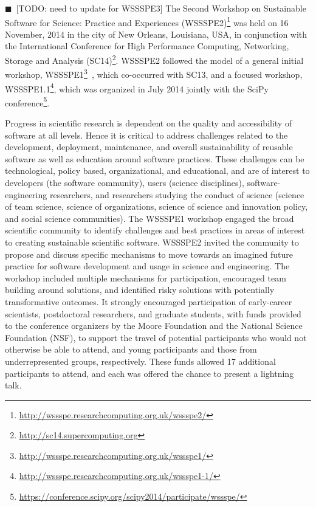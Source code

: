 \documentclass[11pt, oneside]{amsart}
\newcommand{\todo}[1]{{\color{blue}$\blacksquare$~\textsf{[TODO: #1]}}}
\newcommand{\note}[1]{ {\textcolor{blueish}    { ***Note:      #1 }}}
\newcommand{\katznote}[1]{ {\textcolor{magenta}    { ***Dan:      #1 }}}
\newcommand{\gabnote}[1]{ {\textcolor{cyan}    { ***Gabrielle:     #1 }}}
\newcommand{\nchnote}[1]{  {\textcolor{orange}      { ***Neil: #1 }}}
\newcommand{\manishnote}[1]{  {\textcolor{violet}     { ***Manish: #1 }}}
\newcommand{\davidnote}[1]{  {\textcolor{darkgreen}      { ***David: #1 }}}
\begin{document}
%
%
%
%


\todo{need to update for WSSSPE3}
The Second Workshop on Sustainable Software for Science: Practice and
Experiences
(WSSSPE2)\footnote{\url{http://wssspe.researchcomputing.org.uk/wssspe2/}} was
held on 16 November, 2014 in the city of New Orleans, Louisiana, USA, in
conjunction with the International Conference for High Performance Computing,
Networking, Storage and Analysis
(SC14)\footnote{\url{http://sc14.supercomputing.org}}. WSSSPE2 followed the
model of a general initial workshop,
WSSSPE1\footnote{\url{http://wssspe.researchcomputing.org.uk/wssspe1/}}~\cite{WSSSPE1-pre-report,WSSSPE1},
which co-occurred with SC13, and a focused workshop,
WSSSPE1.1\footnote{\url{http://wssspe.researchcomputing.org.uk/wssspe1-1/}},
which was organized in July 2014 jointly with the SciPy
conference\footnote{\url{https://conference.scipy.org/scipy2014/participate/wssspe/}}.

Progress in scientific research is dependent on the quality and accessibility of
software at all levels. Hence it is critical to address challenges related to
the development, deployment, maintenance, and overall sustainability of reusable
software as well as education around software practices. These challenges can be
technological, policy based, organizational, and educational, and are of
interest to developers (the software community), users (science disciplines),
software-engineering researchers, and researchers studying the conduct of
science (science of team science, science of organizations, science of science
and innovation policy, and social science communities). The WSSSPE1 workshop
engaged the broad scientific community to identify challenges and best practices
in areas of interest to creating sustainable scientific software. WSSSPE2
invited the community to propose and discuss specific mechanisms to move towards
an imagined future practice for software development and usage in science and
engineering. The workshop included multiple mechanisms for participation,
encouraged team building around solutions, and identified risky solutions with
potentially transformative outcomes. It strongly encouraged participation of
early-career scientists, postdoctoral researchers, and graduate students, with
funds provided to the conference organizers by the Moore Foundation and the
National Science Foundation (NSF), to support the travel of potential
participants who would not otherwise be able to attend, and young participants
and those from underrepresented groups, respectively. These funds allowed 17
additional participants to attend, and each was offered the chance to present a
lightning talk.
\end{document}
